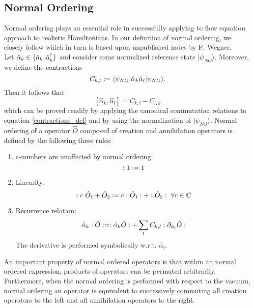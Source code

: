 \subsection{Normal Ordering}
Normal ordering plays an essential role in successfully applying to flow equation approach to realistic Hamiltonians. In our definition of normal ordering, we closely follow \cite[pp. 62-63]{kehrein2006flow} which in turn is based upon unpublished notes by F. Wegner.\\
Let $\hat\alpha_k\in\{\hat a_k,\hat a^\dagger_k\}$ and consider some normalized reference state $|\psi_{NO}\rangle$. Moreover, we define the contractions 
\begin{equation}\label{contractions_def}
C_{k,l}\vcentcolon= \langle \psi_{NO}|\hat\alpha_k\hat\alpha_l|\psi_{NO}\rangle.
\end{equation}
Then it follows that
\begin{equation}
\left[\hat\alpha_k,\hat\alpha_l\right] = C_{k,l}-C_{l,k}
\end{equation}
which can be proved readily by applying the canonical commutation relations to equation \ref{contractions_def} and by using the normalization of $|\psi_{NO}\rangle$.
Normal ordering of a operator $\hat O$ composed of creation and annihilation operators is defined by the following three rules:
\begin{enumerate}
\item c-numbers are unaffected by normal ordering:
\begin{equation}
\vcentcolon 1\vcentcolon = 1
\end{equation}
\item Linearity:
\begin{equation}
\vcentcolon c\ \hat O_1+\hat O_2\vcentcolon = c \vcentcolon \hat O_1\vcentcolon+\vcentcolon \hat O_2\vcentcolon\ \forall c\in\mathbb{C}
\end{equation}
\item Recurrence relation:
\begin{equation}\label{recurrence relation}
\hat\alpha_k\vcentcolon\hat O\vcentcolon=\vcentcolon\hat\alpha_k\hat O\vcentcolon + \sum\limits_l C_{k,l}\vcentcolon{\partial_{\hat\alpha_l}\hat O}\vcentcolon 
\end{equation}
The derivative is performed symbolically w.r.t. $\hat\alpha_l$.
\end{enumerate}
An important property of normal ordered operators is that within an normal ordered expression, products of operators can be permuted arbitrarily.\\
Furthermore, when the normal ordering is performed with respect to the vacuum, normal ordering an operator is equivalent to successively commuting all creation operators to the left and all annihilation operators to the right. 

